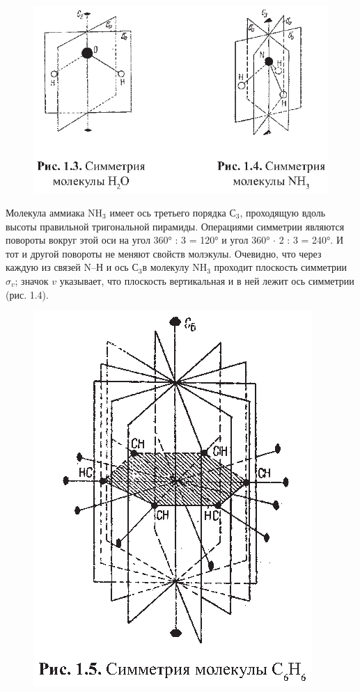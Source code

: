 \begin{figure}[tbp]
\centerline{\hbox{\includegraphics[scale=1]{Ris/ris_eps/ris1_03.eps}}}

\end{figure}
Молекула аммиака NH$_3$ имеет ось третьего порядка $С_3$, проходящую вдоль 
высоты правильной тригональной пирамиды. Операциями симметрии являются повороты 
вокруг этой оси на угол 360° : 3 = 120° и угол 360° $\cdot$ 2 : 3 = 240°. И тот 
и другой повороты не меняют свойств молэкулы. Очевидно, что через каждую из связей 
N--Н и ось $С_3$в молекулу NH$_3$ проходит плоскость симметрии $\sigma_v$; 
значок $v$ указывает, что плоскость вертикальная и в ней лежит ось симметрии (рис. 1.4).

\begin{figure}[tbp]
\centerline{\hbox{\includegraphics[scale=1]{Ris/ris_eps/ris1_05.eps}}}

\end{figure}

